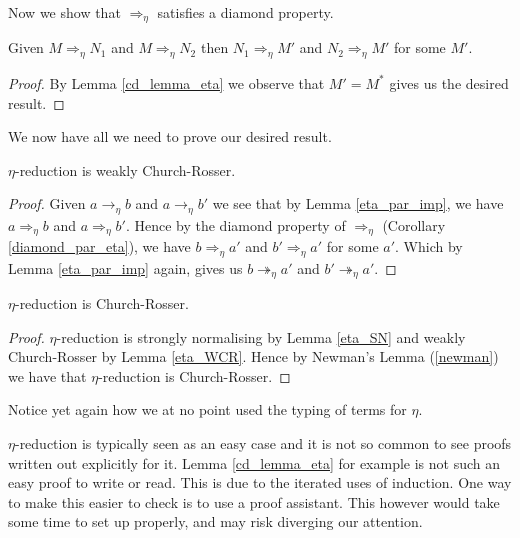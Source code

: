 Now we show that $\Rightarrow_\eta$ satisfies a diamond property.

\begin{cor}\label{diamond_par_eta}
    Given $M \Rightarrow_\eta N_1$ and $M \Rightarrow_\eta N_2$ then $N_1 \Rightarrow_\eta M'$ and $N_2 \Rightarrow_\eta M'$ for some $M'$.
\end{cor}

\begin{proof}
    By Lemma \ref{cd_lemma_eta} we observe that $M' = M^*$ gives us the desired result.
\end{proof}

We now have all we need to prove our desired result.

\begin{lemma}\label{eta_WCR}
    $\eta$-reduction is weakly Church-Rosser.
\end{lemma}

\begin{proof}
    Given $a \to_\eta b$ and $a \to_\eta b'$ we see that by Lemma \ref{eta_par_imp}, we have $a \Rightarrow_\eta b$ and $a \Rightarrow_\eta b'$. Hence by the diamond property of $\Rightarrow_\eta$ (Corollary \ref{diamond_par_eta}), we have $b \Rightarrow_\eta a'$ and $b' \Rightarrow_\eta a'$ for some $a'$. Which by Lemma \ref{eta_par_imp} again, gives us $b \twoheadrightarrow_\eta a'$ and $b' \twoheadrightarrow_\eta a'$.
\end{proof}

\begin{theorem}
    $\eta$-reduction is Church-Rosser.
\end{theorem}

\begin{proof}
    $\eta$-reduction is strongly normalising by Lemma \ref{eta_SN} and weakly Church-Rosser by Lemma \ref{eta_WCR}. Hence by Newman's Lemma (\ref{newman}) we have that $\eta$-reduction is Church-Rosser. 
\end{proof}

\begin{remark}
    Notice yet again how we at no point used the typing of terms for $\eta$.
\end{remark}

\begin{remark}
    $\eta$-reduction is typically seen as an easy case and it is not so common to see proofs written out explicitly for it. Lemma \ref{cd_lemma_eta} for example is not such an easy proof to write or read. This is due to the iterated uses of induction. One way to make this easier to check is to use a proof assistant. This however would take some time to set up properly, and may risk diverging our attention.
\end{remark}


